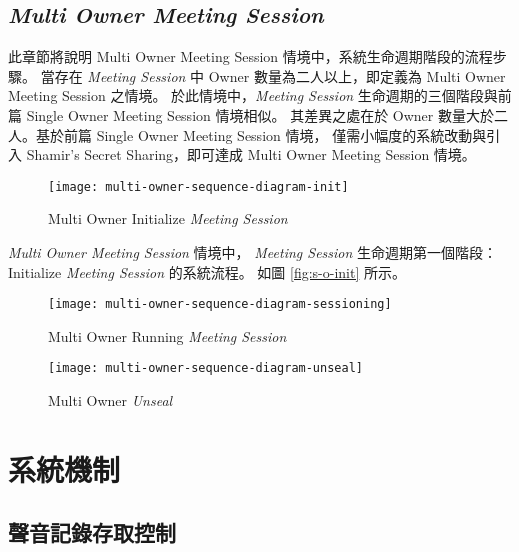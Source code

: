\subsection{{\it Multi Owner Meeting Session}}

此章節將說明 Multi Owner Meeting Session 情境中，系統生命週期階段的流程步驟。
當存在 {\it Meeting Session} 中 Owner 數量為二人以上，即定義為 Multi Owner Meeting Session 之情境。
於此情境中，{\it Meeting Session} 生命週期的三個階段與前篇 Single Owner Meeting Session 情境相似。
其差異之處在於 Owner 數量大於二人。基於前篇 Single Owner Meeting Session 情境，
僅需小幅度的系統改動與引入 Shamir's Secret Sharing，即可達成 Multi Owner Meeting Session 情境。

\begin{figure}[H]
    \centering
    \texttt{[image: multi-owner-sequence-diagram-init]}
    \caption{Multi Owner Initialize {\it Meeting Session}}
    \label{fig:m-o-init}
\end{figure}

    {\it Multi Owner Meeting Session} 情境中，
{\it Meeting Session} 生命週期第一個階段：Initialize {\it Meeting Session} 的系統流程。
如圖 \ref{fig:s-o-init} 所示。

\begin{figure}[H]
    \centering
    \texttt{[image: multi-owner-sequence-diagram-sessioning]}
    \caption{Multi Owner Running {\it Meeting Session}}
    \label{fig:m-o-sessioning}
\end{figure}

\begin{figure}[H]
    \centering
    \texttt{[image: multi-owner-sequence-diagram-unseal]}
    \caption{Multi Owner {\it Unseal}}
    \label{fig:m-o-unseal}
\end{figure}


\section{系統機制}

\subsection{聲音記錄存取控制}

